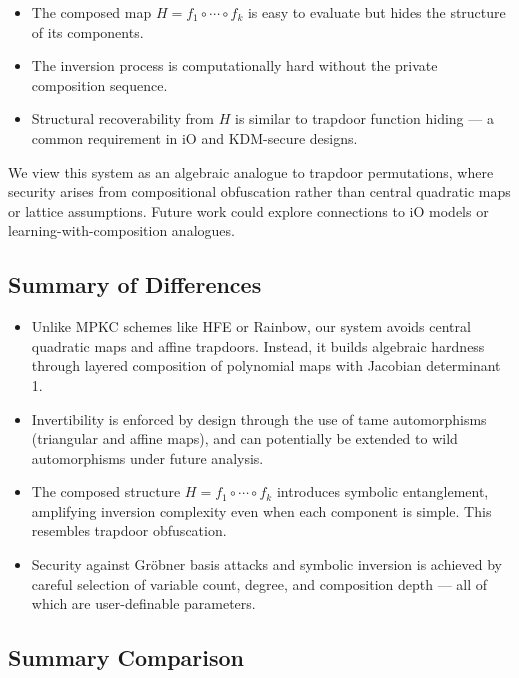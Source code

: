 \documentclass[12pt]{article}
\begin{document}
\begin{itemize}
    \item The composed map \( H = f_1 \circ \cdots \circ f_k \) is easy to evaluate but hides the structure of its components.
    \item The inversion process is computationally hard without the private composition sequence.
    \item Structural recoverability from \( H \) is similar to trapdoor function hiding — a common requirement in iO and KDM-secure designs.
\end{itemize}

We view this system as an algebraic analogue to trapdoor permutations, where security arises from compositional obfuscation rather than central quadratic maps or lattice assumptions. Future work could explore connections to iO models or learning-with-composition analogues.


\subsection*{Summary of Differences}

\begin{itemize}
    \item Unlike MPKC schemes like HFE or Rainbow, our system avoids central quadratic maps and affine trapdoors. Instead, it builds algebraic hardness through layered composition of polynomial maps with Jacobian determinant 1.
    
    \item Invertibility is enforced by design through the use of tame automorphisms (triangular and affine maps), and can potentially be extended to wild automorphisms under future analysis.

    \item The composed structure \( H = f_1 \circ \cdots \circ f_k \) introduces symbolic entanglement, amplifying inversion complexity even when each component is simple. This resembles trapdoor obfuscation.

    \item Security against Gröbner basis attacks and symbolic inversion is achieved by careful selection of variable count, degree, and composition depth — all of which are user-definable parameters.
\end{itemize}


\subsection*{Summary Comparison}
\end{document}
